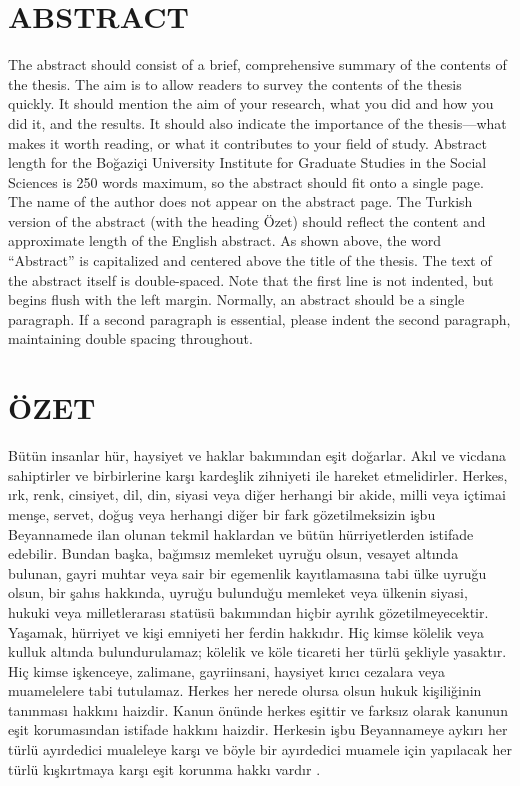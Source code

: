 \chapter*{ABSTRACT\\ \ttitle}
\setcounter{page}{4}

The abstract should consist of a brief, comprehensive summary of the contents of
the thesis. The aim is to allow readers to survey the contents of the thesis
quickly. It should mention the aim of your research, what you did and how you
did it, and the results. It should also indicate the importance of the thesis—what
makes it worth reading, or what it contributes to your field of study. Abstract
length for the Boğaziçi University Institute for Graduate Studies in the Social
Sciences is 250 words maximum, so the abstract should fit onto a single page.
The name of the author does not appear on the abstract page. The Turkish
version of the abstract (with the heading Özet) should reflect the content and
approximate length of the English abstract. As shown above, the word “Abstract”
is capitalized and centered above the title of the thesis. The text of the abstract
itself is double-spaced. Note that the first line is not indented, but begins flush
with the left margin. Normally, an abstract should be a single paragraph. If a
second paragraph is essential, please indent the second paragraph, maintaining
double spacing throughout. 


\newpage

\chapter*{ÖZET\\ \ttitletr}

Bütün insanlar hür, haysiyet ve haklar bakımından eşit doğarlar. Akıl ve vicdana sahiptirler ve birbirlerine karşı kardeşlik zihniyeti ile hareket etmelidirler. Herkes, ırk, renk, cinsiyet, dil, din, siyasi veya diğer herhangi bir akide, milli veya içtimai menşe, servet, doğuş veya herhangi diğer bir fark gözetilmeksizin işbu Beyannamede ilan olunan tekmil haklardan ve bütün hürriyetlerden istifade edebilir. Bundan başka, bağımsız memleket uyruğu olsun, vesayet altında bulunan, gayri muhtar veya sair bir egemenlik kayıtlamasına tabi ülke uyruğu olsun, bir şahıs hakkında, uyruğu bulunduğu memleket veya ülkenin siyasi, hukuki veya milletlerarası statüsü bakımından hiçbir ayrılık gözetilmeyecektir. Yaşamak, hürriyet ve kişi emniyeti her ferdin hakkıdır. Hiç kimse kölelik veya kulluk altında bulundurulamaz; kölelik ve köle ticareti her türlü şekliyle yasaktır. Hiç kimse işkenceye, zalimane, gayriinsani, haysiyet kırıcı cezalara veya muamelelere tabi tutulamaz. Herkes her nerede olursa olsun hukuk kişiliğinin tanınması hakkını haizdir. Kanun önünde herkes eşittir ve farksız olarak kanunun eşit korumasından istifade hakkını haizdir. Herkesin işbu Beyannameye aykırı her türlü ayırdedici mualeleye karşı ve böyle bir ayırdedici muamele için yapılacak her türlü kışkırtmaya karşı eşit korunma hakkı vardır \citep{assembly1948universal}. 
